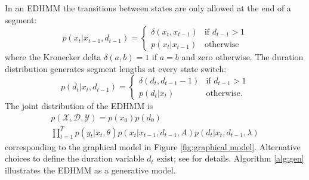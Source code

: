 In an EDHMM the transitions between states are only allowed at the end of a segment:
    \begin{equation}
        p(x_t | x_{t-1}, d_{t-1}) = 
        \begin{cases} 
            \delta(x_t, x_{t-1}) & \textrm{if $d_{t-1} > 1$} \\
            p(x_t | x_{t-1}) & \textrm{otherwise}
        \end{cases}
    \end{equation}
where the Kronecker delta $\delta(a,b) = 1$ if $a=b$ and zero otherwise. The duration distribution generates segment lengths at every state switch:
    \begin{equation}
        p(d_t | x_{t}, d_{t-1}) = 
        \begin{cases} 
            \delta(d_t, d_{t-1}-1) & \textrm{if $d_{t-1} > 1$} \\
            p(d_t | x_{t}) & \textrm{otherwise.}
        \end{cases}
    \end{equation}
The joint distribution of the EDHMM is 
\begin{multline}
    \label{eq:joint}
    p(\mathcal{X},\mathcal{D},\mathcal{Y}) =  
    p(x_0)p(d_0) \\ \prod_{t=1}^T p(y_t | x_t, \theta) p(x_t | x_{t-1}, d_{t-1}, A) p(d_t | x_{t}, d_{t-1}, \lambda)
\end{multline}
corresponding to the graphical model in Figure \ref{fig:graphical model}. Alternative choices to define the duration variable $d_t$ exist; see \cite{Chiappa2011} for details. Algorithm \ref{alg:gen} illustrates the EDHMM as a generative model.
